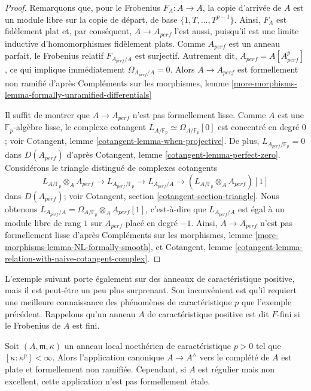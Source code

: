 \begin{proof}
Remarquons que, pour le Frobenius $F_A : A \to A$, la copie d'arrivée de $A$
est un module libre sur la copie de départ, de base $\{1, T, \dots, T^{p - 1}\}$.
Ainsi, $F_A$ est fidèlement plat et, par conséquent,
$A \to A_{perf}$ l'est aussi, puisqu'il est une limite inductive d'homomorphismes fidèlement plats.
Comme $A_{perf}$ est un anneau parfait, le Frobenius relatif
$F_{A_{perf}/A}$ est surjectif. Autrement dit,
$A_{perf} = A[A_{perf}^p]$, ce qui implique immédiatement
$\Omega_{A_{perf}/A} = 0$. Alors
$A \rightarrow A_{perf}$ est formellement non ramifié d'après
Compléments sur les morphismes, lemme
\ref{more-morphisms-lemma-formally-unramified-differentials}

\medskip\noindent
Il suffit de montrer que $A \rightarrow A_{perf}$
n'est pas formellement lisse. Comme $A$ est une
$\mathbb{F}_p$-algèbre lisse, le complexe cotangent
$L_{A/\mathbb{F}_p} \simeq \Omega_{A/\mathbb{F}_p}[0]$
est concentré en degré $0$; voir
Cotangent, lemme \ref{cotangent-lemma-when-projective}. De plus,
$L_{A_{perf}/\mathbb{F}_p} = 0$ dans $D(A_{perf})$
d'après Cotangent, lemme \ref{cotangent-lemma-perfect-zero}.
Considérons le triangle distingué de complexes cotangents
$$
L_{A/\mathbb{F}_p} \otimes_A A_{perf} \to
L_{A_{perf}/\mathbb{F}_p} \to
L_{A_{perf}/A} \to
(L_{A/\mathbb{F}_p} \otimes_A A_{perf})[1]
$$
dans $D(A_{perf})$; voir Cotangent, section \ref{cotangent-section-triangle}.
Nous obtenons $L_{A_{perf}/A} = \Omega_{A/\mathbb{F}_p} \otimes_A A_{perf}[1]$,
c'est-à-dire que $L_{A_{perf}/A}$ est égal à un module libre de rang $1$ sur $A_{perf}$
placé en degré $-1$. Ainsi, $A \rightarrow A_{perf}$
n'est pas formellement lisse d'après
Compléments sur les morphismes, lemme \ref{more-morphisms-lemma-NL-formally-smooth},
et
Cotangent, lemme \ref{cotangent-lemma-relation-with-naive-cotangent-complex}.
\end{proof}

\noindent
L'exemple suivant porte également sur des anneaux de caractéristique positive, mais il est peut-être
un peu plus surprenant. Son inconvénient est qu'il requiert une meilleure connaissance des
phénomènes de caractéristique $p$ que l'exemple précédent. Rappelons qu'un
anneau $A$ de caractéristique positive est dit $F$-fini si le Frobenius de $A$
est fini.

\begin{lemma}
\label{lemma-completion-etale}
Soit $(A, \mathfrak m, \kappa)$ un anneau local noethérien de caractéristique
$p > 0$ tel que $[\kappa : \kappa^p] < \infty$.
Alors l'application canonique $A \to A^\wedge$ vers le complété de $A$
est plate et formellement non ramifiée. Cependant, si $A$ est régulier mais non
excellent, cette application n'est pas formellement \'etale.
\end{lemma}


